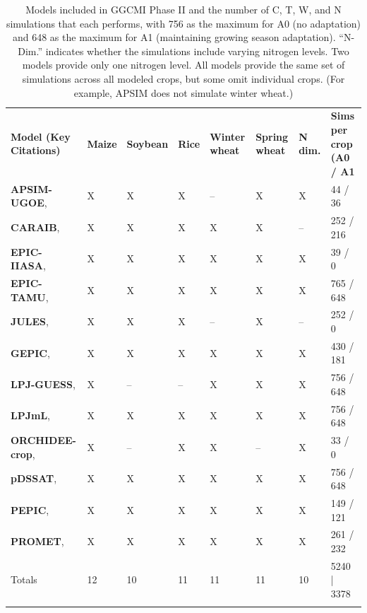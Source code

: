 \documentclass[gmd, manuscript]{copernicus} %
\begin{document}
\begin{table}[t]
\caption{Models included in GGCMI Phase II and the number of C, T, W, and N simulations that each performs, with 756 as the maximum for A0 (no adaptation) and 648 as the maximum for A1 (maintaining growing season adaptation). 
``N-Dim.'' indicates whether the simulations include varying nitrogen levels. Two models provide only one nitrogen level. 
All models provide the same set of simulations across all modeled crops, but some omit individual crops. (For example, APSIM does not simulate winter wheat.)}
\label{table:models}
	\begin{tabular}{p{6cm} p{1cm} p{1cm} p{1cm} p{1cm} p{1cm} p{1cm} p{1.9cm}}
        \tophline
        {\textbf{Model (Key Citations)}}&{\textbf{Maize}}&{\textbf{Soybean}}&{\textbf{Rice}}&{\textbf{Winter wheat}}&{\textbf{Spring wheat}}&{\textbf{N dim.}}&{\textbf{Sims per crop (A0 / A1}}\\ \middlehline
        {\textbf{APSIM-UGOE},   \citet{KEATING2003267, HOLZWORTH2014327}} & {X} & {X} & {X} & {--} & {X} & {X} & {44 / 36}\\ \middlehline
        {\textbf{CARAIB},       \citet{Dury2011, Pirttioja2015}} & {X} & {X} & {X} & {X} & {X} & {--} & {252 / 216}\\ \middlehline
        {\textbf{EPIC-IIASA},   \citet{BALKOVIC2014}} & {X} & {X} & {X} & {X} & {X} & {X} & {39 / 0}\\  \middlehline
        {\textbf{EPIC-TAMU},    \citet{Izaurralde06}} & {X} & {X} & {X} & {X} & {X} & {X} & {765 / 648}\\ \middlehline
        {\textbf{JULES},        \citet{Osborne2015, Williams2015, Williams2017}} & {X} & {X} & {X} & {--} & {X} & {--} & {252 / 0}\\ \middlehline
        {\textbf{GEPIC},        \citet{LIU2007478, FOLBERTH201221}} & {X} & {X} & {X} & {X} & {X} & {X} & {430 / 181}\\ \middlehline
        {\textbf{LPJ-GUESS},    \citet{Lindeskog2013, Olin2015}} & {X} & {--} & {--} & {X} & {X} & {X} & {756 / 648}\\  \middlehline
        {\textbf{LPJmL},        \citet{von_Bloh_implementing_2018}} & {X} & {X} & {X} & {X} & {X} & {X} & {756 / 648}\\ \middlehline
        {\textbf{ORCHIDEE-crop},\citet{Wu2016}} & {X} & {--} & {X} & {X} & {--} & {X} & {33 / 0}\\ \middlehline
        {\textbf{pDSSAT},       \citet{Elliott2014b, JONES2003235}} & {X} & {X} & {X} & {X} & {X} & {X} & {756 / 648}\\ \middlehline
        {\textbf{PEPIC},        \citet{LIU2016164, LIU2016}} & {X} & {X} & {X} & {X} & {X} & {X} & {149 / 121}\\ \middlehline
        {\textbf{PROMET},       \citet{Hank2015, MAUSER2015}} & {X} & {X} & {X} & {X} & {X} & {X} & {261 / 232}\\ \middlehline
        {Totals} & {12} & {10} & {11} & {11} & {11} & {10} & {5240 | 3378}\\
        \bottomhline
    \end{tabular}
\end{table}
\end{document}
